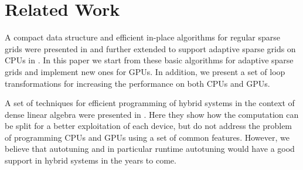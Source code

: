 \section{Related Work}
A compact data structure and efficient in-place algorithms for regular sparse
grids were presented in \cite{murarasu2011} and further extended to support
adaptive sparse grids on CPUs in \cite{murarasu2012}. In this paper we start
from these basic algorithms for adaptive sparse grids and implement new ones for
GPUs. In addition, we present a set of loop transformations for increasing
the performance on both CPUs and GPUs.

A set of techniques for efficient programming of hybrid systems in the context
of dense linear algebra were presented in \cite{Tomov:2010:TDL:1805333.1805388}.
Here they show how the computation can be split for a better exploitation of
each device, but do not address the problem of programming CPUs and GPUs using a
set of common features. However, we believe that autotuning and in particular
runtime autotuning would have a good support in hybrid systems in the years to
come.


